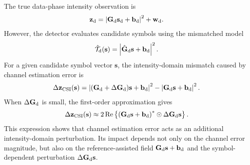\documentclass[journal]{IEEEtran}
\begin{document}
The true data-phase intensity observation is
\begin{equation}
\mathbf{z}_{\rm d}
=
\left|
\mathbf{G}_{\rm d}\mathbf{s}_{\rm d}
+
\mathbf{b}_{\rm d}
\right|^2
+
\mathbf{w}_{\rm d}.
\label{eq:true_data_observation}
\end{equation}
However, the detector evaluates candidate symbols using the mismatched model
\begin{equation}
\hat{\mathcal{T}}_{\rm d}(\mathbf{s})
=
\left|
\hat{\mathbf{G}}_{\rm d}\mathbf{s}
+
\mathbf{b}_{\rm d}
\right|^2.
\label{eq:mismatched_detection_mapping}
\end{equation}
For a given candidate symbol vector $\mathbf{s}$, the intensity-domain mismatch caused by channel estimation error is
\begin{equation}
\Delta\mathbf{z}_{\rm CSI}(\mathbf{s})
=
\left|
(\mathbf{G}_{\rm d}+\Delta\mathbf{G}_{\rm d})\mathbf{s}
+
\mathbf{b}_{\rm d}
\right|^2
-
\left|
\mathbf{G}_{\rm d}\mathbf{s}
+
\mathbf{b}_{\rm d}
\right|^2.
\label{eq:csi_error_intensity_mismatch}
\end{equation}
When $\Delta\mathbf{G}_{\rm d}$ is small, the first-order approximation gives
\begin{equation}
\Delta\mathbf{z}_{\rm CSI}(\mathbf{s})
\approx
2\operatorname{Re}
\left\{
\left(
\mathbf{G}_{\rm d}\mathbf{s}
+
\mathbf{b}_{\rm d}
\right)^*
\odot
\Delta\mathbf{G}_{\rm d}\mathbf{s}
\right\}.
\label{eq:csi_error_first_order}
\end{equation}
This expression shows that channel estimation error acts as an additional intensity-domain perturbation. 
Its impact depends not only on the channel error magnitude, but also on the reference-assisted field $\mathbf{G}_{\rm d}\mathbf{s}+\mathbf{b}_{\rm d}$ and the symbol-dependent perturbation $\Delta\mathbf{G}_{\rm d}\mathbf{s}$.
\end{document}
